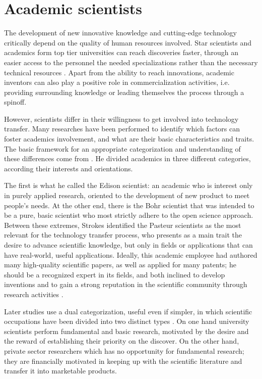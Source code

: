 \section{Academic scientists}

The development of new innovative knowledge and cutting-edge technology critically depend on the quality of human resources involved. Star scientists and academics form top tier universities can reach discoveries faster, through an easier access to the personnel the needed specializations rather than the necessary technical resources \citep{OShea2005}. Apart from the ability to reach innovations, academic inventors can also play a positive role in commercialization activities, i.e. providing surrounding knowledge or leading themselves the process through a spinoff.

However, scientists differ in their willingness to get involved into technology transfer. Many researches have been performed to identify which factors can foster academics involvement, and what are their basic characteristics and traits. The basic framework for an appropriate categorization and understanding of these differences come from \citet{Stokes1997}. He divided academics in three different categories, according their interests and orientations. 

The first is what he called the Edison scientist: an academic who is interest only in purely applied research, oriented to the development of new product to meet people's needs. At the other end, there is the Bohr scientist that was intended to be a pure, basic scientist who most strictly adhere to the open science approach. Between these extremes, Strokes identified the Pasteur scientists as the most relevant for the technology transfer process, who presents as a main trait the desire to advance scientific knowledge, but only in fields or applications that can have real-world, useful applications. Ideally, this academic employee had authored many high-quality scientific papers, as well as applied for many patents; he should be a recognized expert in its fields, and both inclined to develop inventions and to gain a strong reputation in the scientific community through research activities \citep{Baba2009}.

Later studies use a dual categorization, useful even if simpler, in which scientific occupations have been divided into two distinct types \citep{Beath2000}. On one hand university scientists perform fundamental and basic research, motivated by the desire and the reward of establishing their priority on the discover. On the other hand, private sector researchers which has no opportunity for fundamental research; they are financially motivated in keeping up with the scientific literature and transfer it into marketable products. 

